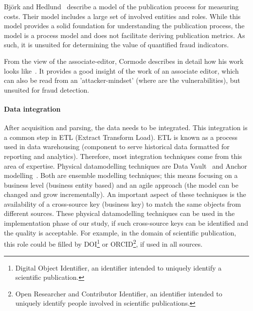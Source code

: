 \documentclass{ou-report}
\newcommand{\doi}{{DOI}}
\newcommand{\orcid}{ORCID}
\begin{document}
Björk and Hedlund~\cite{BH2004} describe a  model of the publication process
for measuring costs. Their model includes a large set of involved entities
and roles. While this model provides a solid foundation for understanding the
publication process, the model is a process model and does not facilitate
deriving publication metrics. As such, it is unsuited for determining
the value of quantified fraud indicators.

From the view of the associate-editor, Cormode describes in detail how his work
looks like~\cite{C2013}. It provides a good insight of the work of an associate 
editor, which can also be read from an 'attacker-mindset' (where are the 
vulnerabilities), but unsuited for fraud detection.


\paragraph{Data integration}
After acquisition and parsing, the data needs to be integrated. This integration
is a common step in ETL (Extract Transform Load). ETL is known as a process
used in data warehousing (component to serve historical data formatted
for reporting and analytics). Therefore, most integration techniques come from
this area of expertise. Physical datamodelling techniques are Data
Vault~\cite{linstedt2015building} and Anchor
modelling~\cite{ronnback2010anchor}. Both are ensemble modelling techniques;
this means focusing on a business level (business entity based) and an agile
approach (the model can be changed and grow incrementally). An important aspect
of these techniques is the availability of a cross-source key (business key) to
match the same objects from different sources. These physical datamodelling
techniques can be used in the implementation phase of our study, if such
cross-source keys can be identified and the quality is acceptable.
For example, in the domain of scientific publication, this role could be filled
by \doi{}\footnote{Digital Object Identifier, an identifier intended to uniquely
identify a scientific publication.} or \orcid{}\footnote{Open Researcher and Contributor
Identifier, an identifier intended to uniquely identify people involved in scientific
publications.}, if used in all sources. 

\end{document}
